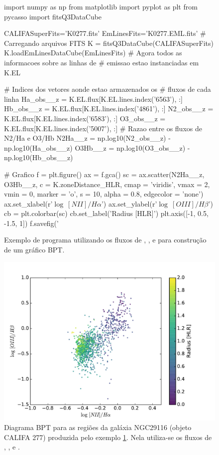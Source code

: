 \begin{figure}
	\begin{python}
import numpy as np
from matplotlib import pyplot as plt
from pycasso import fitsQ3DataCube

CALIFASuperFits='K0277.fits'
EmLinesFits='K0277.EML.fits'
# Carregando arquivos FITS
K = fitsQ3DataCube(CALIFASuperFits)
K.loadEmLinesDataCube(EmLinesFits)
# Agora todos as informacoes sobre as linhas de
# emissao estao instanciadas em K.EL

# Indices dos vetores aonde estao armazenados os
# fluxos de cada linha
Ha_obs__z = K.EL.flux[K.EL.lines.index('6563'), :]
Hb_obs__z = K.EL.flux[K.EL.lines.index('4861'), :]
N2_obs__z = K.EL.flux[K.EL.lines.index('6583'), :]
O3_obs__z = K.EL.flux[K.EL.lines.index('5007'), :]
# Razao entre os fluxos de N2/Ha e O3/Hb
N2Ha__z = np.log10(N2_obs__z) - np.log10(Ha_obs__z)
O3Hb__z = np.log10(O3_obs__z) - np.log10(Hb_obs__z)

# Grafico
f = plt.figure()
ax = f.gca()
sc = ax.scatter(N2Ha__z, O3Hb__z, c = K.zoneDistance_HLR,
           cmap = 'viridis', vmax = 2, vmin = 0,
           marker = 'o', s = 10, alpha = 0.8, edgecolor = 'none')
ax.set_xlabel(r'$\log\ [NII]/H\alpha$')
ax.set_ylabel(r'$\log\ [OIII]/H\beta$')
cb = plt.colorbar(sc)
cb.set_label('Radius [HLR]')
plt.axis([-1, 0.5, -1.5, 1])
f.savefig('%
	\end{python}
	\caption[Exemplo de programa utilizando o EmLinesDataCube.]
	{Exemplo de programa utilizando os fluxos de \Halpha, \Hbeta, \OIII e \NII 
	para construção de um gráfico BPT.}
	\label{fig:BPTprog}
\end{figure}

\begin{figure}
	\centering
	\includegraphics[scale=0.85]{figuras/K0277-BPT.pdf}
	\caption[Diagrama BPT produzido pelo programa no exemplo da Fig. \ref{fig:BPTprog}.]
	{Diagrama BPT para as regiões da galáxia NGC29116 (objeto CALIFA 277) produzida pelo exemplo
	\ref{fig:BPTprog}. Nela utiliza-se os fluxos de \Halpha, \Hbeta, \OIII e \NII.}
	\label{fig:BPTfig}
\end{figure}

